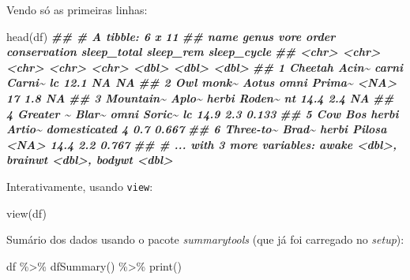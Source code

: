 \documentclass[
  11pt]{report}
\newenvironment{Shaded}{\begin{snugshade}}{\end{snugshade}}
\newcommand{\DocumentationTok}[1]{\textcolor[rgb]{0.56,0.35,0.01}{\textbf{\textit{#1}}}}
\newcommand{\FunctionTok}[1]{\textcolor[rgb]{0.00,0.00,0.00}{#1}}
\newcommand{\NormalTok}[1]{#1}
\newcommand{\SpecialCharTok}[1]{\textcolor[rgb]{0.00,0.00,0.00}{#1}}
\begin{document}
Vendo só as primeiras linhas:

\begin{Shaded}
\begin{Highlighting}[]
\FunctionTok{head}\NormalTok{(df)}
\DocumentationTok{\#\# \# A tibble: 6 x 11}
\DocumentationTok{\#\#   name      genus vore  order  conservation sleep\_total sleep\_rem sleep\_cycle}
\DocumentationTok{\#\#   \textless{}chr\textgreater{}     \textless{}chr\textgreater{} \textless{}chr\textgreater{} \textless{}chr\textgreater{}  \textless{}chr\textgreater{}              \textless{}dbl\textgreater{}     \textless{}dbl\textgreater{}       \textless{}dbl\textgreater{}}
\DocumentationTok{\#\# 1 Cheetah   Acin\textasciitilde{} carni Carni\textasciitilde{} lc                  12.1      NA        NA    }
\DocumentationTok{\#\# 2 Owl monk\textasciitilde{} Aotus omni  Prima\textasciitilde{} \textless{}NA\textgreater{}                17         1.8      NA    }
\DocumentationTok{\#\# 3 Mountain\textasciitilde{} Aplo\textasciitilde{} herbi Roden\textasciitilde{} nt                  14.4       2.4      NA    }
\DocumentationTok{\#\# 4 Greater \textasciitilde{} Blar\textasciitilde{} omni  Soric\textasciitilde{} lc                  14.9       2.3       0.133}
\DocumentationTok{\#\# 5 Cow       Bos   herbi Artio\textasciitilde{} domesticated         4         0.7       0.667}
\DocumentationTok{\#\# 6 Three{-}to\textasciitilde{} Brad\textasciitilde{} herbi Pilosa \textless{}NA\textgreater{}                14.4       2.2       0.767}
\DocumentationTok{\#\# \# ... with 3 more variables: awake \textless{}dbl\textgreater{}, brainwt \textless{}dbl\textgreater{}, bodywt \textless{}dbl\textgreater{}}
\end{Highlighting}
\end{Shaded}

Interativamente, usando \texttt{view}:

\begin{Shaded}
\begin{Highlighting}[]
\FunctionTok{view}\NormalTok{(df)}
\end{Highlighting}
\end{Shaded}

Sumário dos dados usando o pacote \emph{summarytools} (que já foi carregado no \emph{setup}):

\begin{Shaded}
\begin{Highlighting}[]
\NormalTok{df }\SpecialCharTok{\%\textgreater{}\%} \FunctionTok{dfSummary}\NormalTok{() }\SpecialCharTok{\%\textgreater{}\%} \FunctionTok{print}\NormalTok{()}
\end{Highlighting}
\end{Shaded}
\end{document}
